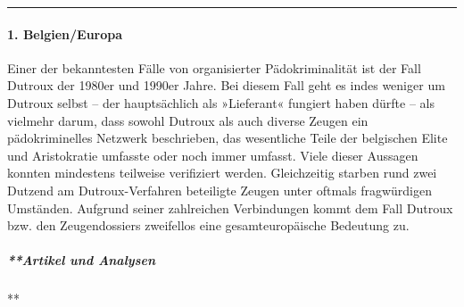 \begin{center}\rule{0.5\linewidth}{\linethickness}\end{center}

\hypertarget{1-belgieneuropa}{%
\paragraph{1. Belgien/Europa}\label{1-belgieneuropa}}

Einer der bekanntesten Fälle von organisierter Pädokriminalität ist der
Fall Dutroux der 1980er und 1990er Jahre. Bei diesem Fall geht es indes
weniger um Dutroux selbst -- der hauptsächlich als »Lieferant« fungiert
haben dürfte -- als vielmehr darum, dass sowohl Dutroux als auch diverse
Zeugen ein pädokriminelles Netzwerk beschrieben, das wesentliche Teile
der belgischen Elite und Aristo­kratie umfasste oder noch immer umfasst.
Viele dieser Aussagen konnten mindestens teilweise verifiziert werden.
Gleichzeitig starben rund zwei Dutzend am Dutroux-Verfahren beteiligte
Zeugen unter oftmals fragwürdigen Umständen. Aufgrund seiner zahlreichen
Verbindungen kommt dem Fall Dutroux bzw. den Zeugendossiers zweifellos
eine gesamteuropäische Bedeutung zu.

\hypertarget{artikel-und-analysen}{%
\subparagraph{**Artikel und Analysen}\label{artikel-und-analysen}}

**

